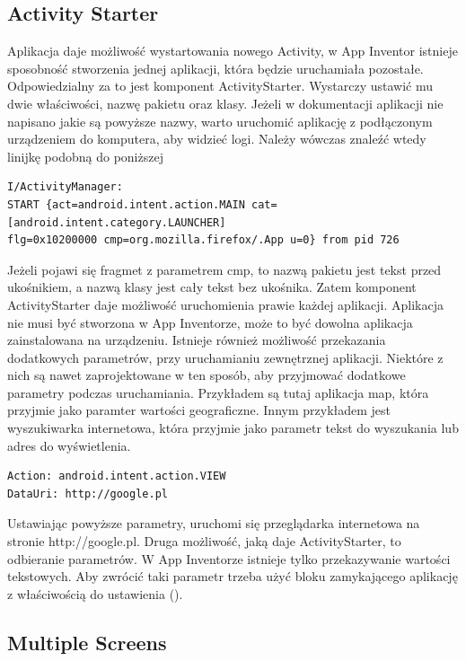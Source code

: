 \subsection{Activity Starter}

Aplikacja daje możliwość wystartowania nowego Activity, w App Inventor istnieje sposobność stworzenia jednej aplikacji, która będzie uruchamiała pozostałe. Odpowiedzialny za to jest komponent ActivityStarter. Wystarczy ustawić mu dwie właściwości, nazwę pakietu oraz klasy. Jeżeli w dokumentacji aplikacji nie napisano jakie są powyższe nazwy, warto uruchomić aplikację z podłączonym urządzeniem do komputera, aby widzieć logi. Należy wówczas znaleźć wtedy linijkę podobną do poniższej

\begin{lstlisting}
I/ActivityManager:
START {act=android.intent.action.MAIN cat=[android.intent.category.LAUNCHER]
flg=0x10200000 cmp=org.mozilla.firefox/.App u=0} from pid 726
\end{lstlisting}

Jeżeli pojawi się fragmet z parametrem cmp, to nazwą pakietu jest tekst przed ukośnikiem, a nazwą klasy jest cały tekst bez ukośnika. Zatem komponent ActivityStarter daje możliwość uruchomienia prawie każdej aplikacji. Aplikacja nie musi być stworzona w App Inventorze, może to być dowolna aplikacja zainstalowana na urządzeniu. Istnieje również możliwość przekazania dodatkowych parametrów, przy uruchamianiu zewnętrznej aplikacji. Niektóre z nich są nawet zaprojektowane w ten sposób, aby przyjmować dodatkowe parametry podczas uruchamiania. Przykładem są tutaj aplikacja map, która przyjmie jako paramter wartości geograficzne. Innym przykładem jest wyszukiwarka internetowa, która przyjmie jako parametr tekst do wyszukania lub adres do wyświetlenia.

\begin{lstlisting}
Action: android.intent.action.VIEW
DataUri: http://google.pl
\end{lstlisting}

Ustawiając powyższe parametry, uruchomi się przeglądarka internetowa na stronie http://google.pl. Druga możliwość, jaką daje ActivityStarter, to odbieranie parametrów. W App Inventorze istnieje tylko przekazywanie wartości tekstowych. Aby zwrócić taki parametr trzeba użyć bloku zamykającego aplikację z właściwością do ustawienia ().

\subsection{Multiple Screens}

